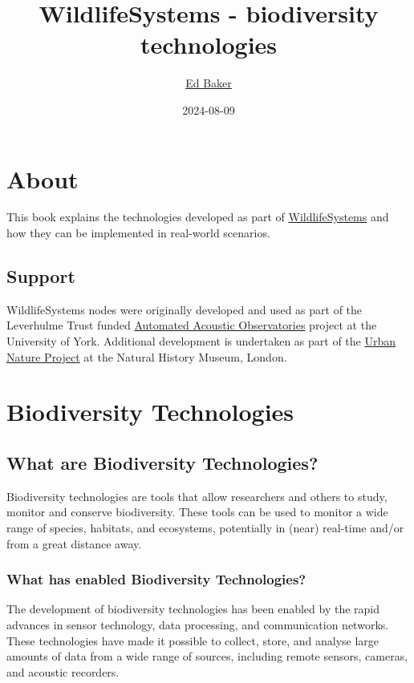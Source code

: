 \documentclass[
]{book}
\title{WildlifeSystems - biodiversity technologies}
\author{\href{https://ebaker.me.uk}{Ed Baker}}
\date{2024-08-09}
\begin{document}
\maketitle

{
\setcounter{tocdepth}{1}
\tableofcontents
}
\chapter*{About}\label{about}

This book explains the technologies developed as part of \href{https://wildlife.systems}{WildlifeSystems} and how they can be implemented in real-world scenarios.

\section*{Support}\label{support}

WildlifeSystems nodes were originally developed and used as part of the Leverhulme Trust funded \href{https://ebaker.me.uk/aao}{Automated Acoustic Observatories} project at the University of York. Additional development is undertaken as part of the \href{https://www.nhm.ac.uk/about-us/urban-nature-project.html}{Urban Nature Project} at the Natural History Museum, London.

\chapter{Biodiversity Technologies}\label{biodiversity-technologies}

\section{What are Biodiversity Technologies?}\label{what-are-biodiversity-technologies}

Biodiversity technologies are tools that allow researchers and others to study, monitor and
conserve biodiversity. These tools can be used to monitor a wide range of species, habitats, and ecosystems, potentially in (near) real-time and/or from a great distance away.

\subsection{What has enabled Biodiversity Technologies?}\label{what-has-enabled-biodiversity-technologies}

The development of biodiversity technologies has been enabled by the rapid advances in sensor technology, data processing, and communication networks. These technologies have made it possible to collect, store, and analyse large amounts of data from a wide range of sources, including remote sensors, cameras, and acoustic recorders.
\end{document}
